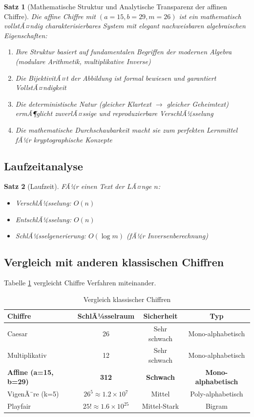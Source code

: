 ﻿\documentclass[12pt,a4paper]{article}
\newtheorem{theorem}{Satz}
\begin{document}
	\begin{theorem}[Mathematische Struktur und Analytische Transparenz der affinen Chiffre]
		Die affine Chiffre mit $(a=15, b=29, m=26)$ ist ein mathematisch vollstÃ¤ndig charakterisierbares System mit elegant nachweisbaren algebraischen Eigenschaften:
		\begin{enumerate}
			\item Ihre Struktur basiert auf fundamentalen Begriffen der modernen Algebra (modulare Arithmetik, multiplikative Inverse)
			\item Die BijektivitÃ¤t der Abbildung ist formal bewiesen und garantiert VollstÃ¤ndigkeit
			\item Die deterministische Natur (gleicher Klartext $\to$ gleicher Geheimtext) ermÃ¶glicht zuverlÃ¤ssige und reproduzierbare VerschlÃ¼sselung
			\item Die mathematische Durchschaubarkeit macht sie zum perfekten Lernmittel fÃ¼r kryptographische Konzepte
		\end{enumerate}
	\end{theorem}
	
	\subsection{Laufzeitanalyse}
	
	\begin{theorem}[Laufzeit]
		FÃ¼r einen Text der LÃ¤nge $n$:
		\begin{itemize}
			\item VerschlÃ¼sselung: $O(n)$
			\item EntschlÃ¼sselung: $O(n)$
			\item SchlÃ¼sselgenerierung: $O(\log m)$ (fÃ¼r Inversenberechnung)
		\end{itemize}
	\end{theorem}
	
	\subsection{Vergleich mit anderen klassischen Chiffren}
	Tabelle \ref{tab:cpm-chiffre} vergleicht Chiffre Verfahren miteinander.
	\begin{table}
		\centering
		\caption{Vergleich klassischer Chiffren}
		\begin{tabular}{|l|c|c|c|}
			\hline
			\textbf{Chiffre} & \textbf{SchlÃ¼sselraum} & \textbf{Sicherheit} & \textbf{Typ} \\
			\hline\hline
			Caesar & 26 & Sehr schwach & Mono-alphabetisch \\
			\hline
			Multiplikativ & 12 & Sehr schwach & Mono-alphabetisch \\
			\hline
			\textbf{Affine (a=15, b=29)} & \textbf{312} & \textbf{Schwach} & \textbf{Mono-alphabetisch} \\
			\hline
			VigenÃ¨re (k=5) & $26^5 \approx 1.2 \times 10^7$ & Mittel & Poly-alphabetisch \\
			\hline
			Playfair & $25! \approx 1.6 \times 10^{25}$ & Mittel-Stark & Bigram \\
			\hline
		\end{tabular}
		\label{tab:cpm-chiffre}
	\end{table}
	
\end{document}
